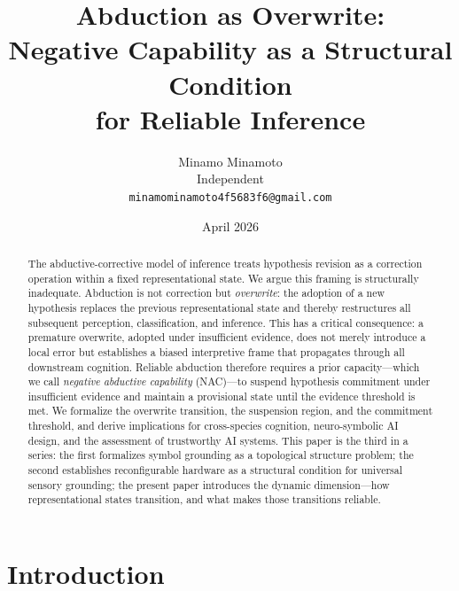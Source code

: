 \documentclass[12pt]{article}
\title{Abduction as Overwrite:\\
Negative Capability as a Structural Condition\\
for Reliable Inference}
\author{Minamo Minamoto\\
Independent\\
\texttt{minamominamoto4f5683f6@gmail.com}}
\date{April 2026}
\begin{document}
\maketitle

\begin{abstract}
The abductive-corrective model of inference treats hypothesis revision as
a correction operation within a fixed representational state.
We argue this framing is structurally inadequate.
Abduction is not correction but \emph{overwrite}: the adoption of a new
hypothesis replaces the previous representational state and thereby
restructures all subsequent perception, classification, and inference.
This has a critical consequence: a premature overwrite, adopted under
insufficient evidence, does not merely introduce a local error but
establishes a biased interpretive frame that propagates through all
downstream cognition.
Reliable abduction therefore requires a prior capacity---which we call
\emph{negative abductive capability} (NAC)---to suspend hypothesis
commitment under insufficient evidence and maintain a provisional state
until the evidence threshold is met.
We formalize the overwrite transition, the suspension region, and the
commitment threshold, and derive implications for cross-species cognition,
neuro-symbolic AI design, and the assessment of trustworthy AI systems.
This paper is the third in a series: the first \cite{minamoto2026topology}
formalizes symbol grounding as a topological structure problem; the second
\cite{minamoto2026cgla} establishes reconfigurable hardware as a structural
condition for universal sensory grounding; the present paper introduces
the dynamic dimension---how representational states transition, and what
makes those transitions reliable.
\end{abstract}

\tableofcontents

\section{Introduction}
\end{document}
